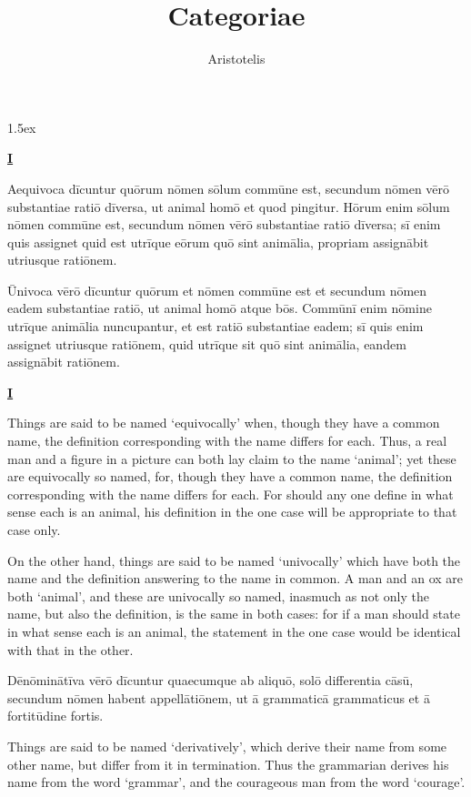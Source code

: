 \documentclass[14pt,twoside]{extbook}
\newcommand{\mktitle}[1]{%
    {\begin{center}\small\textsc{\bfseries\underline{#1}}\end{center}}}
\begin{document}
\parskip 1.5ex

\title{Categoriae}
\author{Aristotelis}

\mainmatter

\mktitle{I}

Aequivoca dīcuntur quōrum nōmen sōlum commūne est, secundum nōmen vērō
substantiae ratiō dīversa, ut animal homō et quod pingitur. Hōrum enim
sōlum nōmen commūne est, secundum nōmen vērō substantiae ratiō
dīversa; sī enim quis assignet quid est utrīque eōrum quō sint
animālia, propriam assignābit utriusque ratiōnem.

Ūnivoca vērō dīcuntur quōrum et nōmen commūne est et secundum nōmen
eadem substantiae ratiō, ut animal homō atque bōs. Commūnī enim nōmine
utrīque animālia nuncupantur, et est ratiō substantiae eadem; sī quis
enim assignet utriusque ratiōnem, quid utrīque sit quō sint animālia,
eandem assignābit ratiōnem.

\newpage

\mktitle{I}

Things are said to be named `equivocally' when, though they have a common name, the definition corresponding with the name differs for each. Thus, a real man and a figure in a picture can both lay claim to the name `animal'; yet these are equivocally so named, for, though they have a common name, the definition corresponding with the name differs for each. For should any one define in what sense each is an animal, his definition in the one case will be appropriate to that case only.

On the other hand, things are said to be named `univocally' which have both the name and the definition answering to the name in common. A man and an ox are both `animal', and these are univocally so named, inasmuch as not only the name, but also the definition, is the same in both cases: for if a man should state in what sense each is an animal, the statement in the one case would be identical with that in the other.

\newpage

Dēnōminātīva vērō dīcuntur quaecumque ab aliquō, solō differentia
cāsū, secundum nōmen habent appellātiōnem, ut ā grammaticā grammaticus
et ā fortitūdine fortis.

\newpage

Things are said to be named `derivatively', which derive their name from some other name, but differ from it in termination. Thus the grammarian derives his name from the word `grammar', and the courageous man from the word `courage'.
\end{document}
